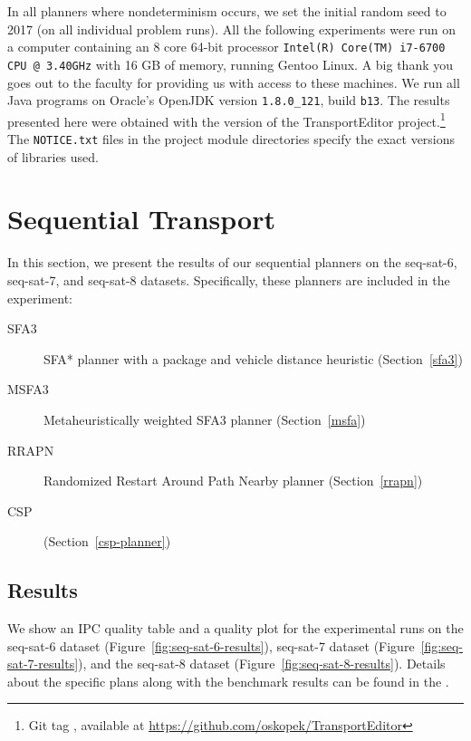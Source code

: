 In all planners where nondeterminism occurs,
we set the initial random seed to 2017
(on all individual problem runs).
All the following experiments
were run on a computer
containing an 8 core 64-bit processor \texttt{Intel(R) Core(TM) i7-6700 CPU @ 3.40GHz}
with 16 GB of memory, running Gentoo Linux.
A big thank you goes out to the faculty for providing us with access to these machines.
We run all Java programs on Oracle's OpenJDK 
version \texttt{1.8.0\_121}, build \texttt{b13}.
The results presented here were obtained with the \TEver{} version of the TransportEditor project.\footnote{Git tag \TEtag{}, available at \url{https://github.com/oskopek/TransportEditor}} The \texttt{NOTICE.txt} files
in the project module directories specify
the exact versions of libraries used.



















\section{Sequential Transport}

In this section, we present the results of our sequential planners on the seq-sat-6, seq-sat-7, and seq-sat-8 datasets. Specifically, these planners are included in the experiment:
\begin{description}
\item[SFA3] SFA* planner with a package and vehicle distance heuristic (Section~\ref{sfa3})
\item[MSFA3] Metaheuristically weighted SFA3 planner (Section~\ref{msfa})
\item[RRAPN] Randomized Restart Around Path Nearby planner (Section~\ref{rrapn})
\item[CSP]  (Section~\ref{csp-planner})
\end{description}

\subsection{Results}\label{sequential-results}

We show an IPC quality table and a quality plot
for the experimental runs on the seq-sat-6 dataset (Figure~\ref{fig:seq-sat-6-results}), seq-sat-7 dataset (Figure~\ref{fig:seq-sat-7-results}), and the seq-sat-8 dataset (Figure~\ref{fig:seq-sat-8-results}). Details about the specific plans along with the benchmark results can be found in the .

